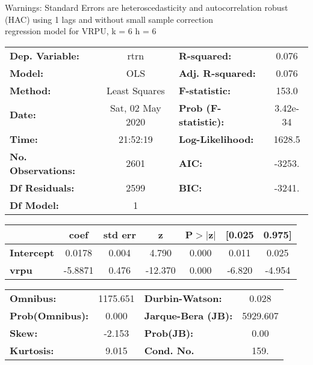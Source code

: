 Warnings: \newline
 [1] Standard Errors are heteroscedasticity and autocorrelation robust (HAC) using 1 lags and without small sample correction\\ 

regression model for VRPU, k = 6 h = 6\begin{center}
\begin{tabular}{lclc}
\toprule
\textbf{Dep. Variable:}    &       rtrn       & \textbf{  R-squared:         } &     0.076   \\
\textbf{Model:}            &       OLS        & \textbf{  Adj. R-squared:    } &     0.076   \\
\textbf{Method:}           &  Least Squares   & \textbf{  F-statistic:       } &     153.0   \\
\textbf{Date:}             & Sat, 02 May 2020 & \textbf{  Prob (F-statistic):} &  3.42e-34   \\
\textbf{Time:}             &     21:52:19     & \textbf{  Log-Likelihood:    } &    1628.5   \\
\textbf{No. Observations:} &        2601      & \textbf{  AIC:               } &    -3253.   \\
\textbf{Df Residuals:}     &        2599      & \textbf{  BIC:               } &    -3241.   \\
\textbf{Df Model:}         &           1      & \textbf{                     } &             \\
\bottomrule
\end{tabular}
\begin{tabular}{lcccccc}
                   & \textbf{coef} & \textbf{std err} & \textbf{z} & \textbf{P$> |$z$|$} & \textbf{[0.025} & \textbf{0.975]}  \\
\midrule
\textbf{Intercept} &       0.0178  &        0.004     &     4.790  &         0.000        &        0.011    &        0.025     \\
\textbf{vrpu}      &      -5.8871  &        0.476     &   -12.370  &         0.000        &       -6.820    &       -4.954     \\
\bottomrule
\end{tabular}
\begin{tabular}{lclc}
\textbf{Omnibus:}       & 1175.651 & \textbf{  Durbin-Watson:     } &    0.028  \\
\textbf{Prob(Omnibus):} &   0.000  & \textbf{  Jarque-Bera (JB):  } & 5929.607  \\
\textbf{Skew:}          &  -2.153  & \textbf{  Prob(JB):          } &     0.00  \\
\textbf{Kurtosis:}      &   9.015  & \textbf{  Cond. No.          } &     159.  \\
\bottomrule
\end{tabular}
\end{center}

